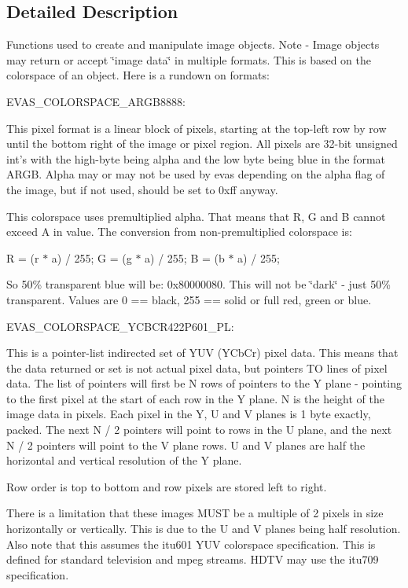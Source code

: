 \subsection{Detailed Description}
Functions used to create and manipulate image objects. Note -\/ Image objects may return or accept \char`\"{}image data\char`\"{} in multiple formats. This is based on the colorspace of an object. Here is a rundown on formats:

EVAS\_\-COLORSPACE\_\-ARGB8888:

This pixel format is a linear block of pixels, starting at the top-\/left row by row until the bottom right of the image or pixel region. All pixels are 32-\/bit unsigned int's with the high-\/byte being alpha and the low byte being blue in the format ARGB. Alpha may or may not be used by evas depending on the alpha flag of the image, but if not used, should be set to 0xff anyway.

This colorspace uses premultiplied alpha. That means that R, G and B cannot exceed A in value. The conversion from non-\/premultiplied colorspace is:

R = (r $\ast$ a) / 255; G = (g $\ast$ a) / 255; B = (b $\ast$ a) / 255;

So 50\% transparent blue will be: 0x80000080. This will not be \char`\"{}dark\char`\"{} -\/ just 50\% transparent. Values are 0 == black, 255 == solid or full red, green or blue.

EVAS\_\-COLORSPACE\_\-YCBCR422P601\_\-PL:

This is a pointer-\/list indirected set of YUV (YCbCr) pixel data. This means that the data returned or set is not actual pixel data, but pointers TO lines of pixel data. The list of pointers will first be N rows of pointers to the Y plane -\/ pointing to the first pixel at the start of each row in the Y plane. N is the height of the image data in pixels. Each pixel in the Y, U and V planes is 1 byte exactly, packed. The next N / 2 pointers will point to rows in the U plane, and the next N / 2 pointers will point to the V plane rows. U and V planes are half the horizontal and vertical resolution of the Y plane.

Row order is top to bottom and row pixels are stored left to right.

There is a limitation that these images MUST be a multiple of 2 pixels in size horizontally or vertically. This is due to the U and V planes being half resolution. Also note that this assumes the itu601 YUV colorspace specification. This is defined for standard television and mpeg streams. HDTV may use the itu709 specification.

